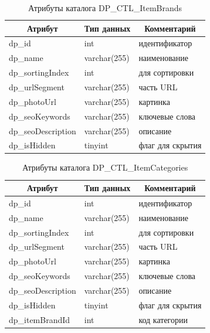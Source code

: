 \begin{table}[p]
    \centering\small

    \caption{Атрибуты каталога DP\_CTL\_ItemBrands}
    \label{tab:DP_CTL_ItemBrands}

    \begin{tabular}{|p{5cm}|p{2.5cm}|p{9cm}|}
        \hline
        \multicolumn{1}{|c|}{Атрибут}
        & \multicolumn{1}{c|}{Тип данных}
        & \multicolumn{1}{c|}{Комментарий}
        \\ \hline

        dp\_id & int & идентификатор \\ \hline
        dp\_name & varchar(255) & наименование \\ \hline
        dp\_sortingIndex & int & для сортировки \\ \hline
        dp\_urlSegment & varchar(255) & часть URL \\ \hline
        dp\_photoUrl & varchar(255) & картинка\\ \hline
        dp\_seoKeywords & varchar(255) & ключевые слова \\ \hline
        dp\_seoDescription & varchar(255) & описание \\ \hline
        dp\_isHidden & tinyint & флаг для скрытия \\ \hline
    \end{tabular}
\end{table}

\begin{table}[p]
    \centering\small

    \caption{Атрибуты каталога DP\_CTL\_ItemCategories}
    \label{tab:DP_CTL_ItemCategories}

    \begin{tabular}{|p{5cm}|p{2.5cm}|p{9cm}|}
        \hline
        \multicolumn{1}{|c|}{Атрибут}
        & \multicolumn{1}{c|}{Тип данных}
        & \multicolumn{1}{c|}{Комментарий}
        \\ \hline

        dp\_id & int & идентификатор \\ \hline
        dp\_name & varchar(255) & наименование \\ \hline
        dp\_sortingIndex & int & для сортировки \\ \hline
        dp\_urlSegment & varchar(255) & часть URL\\ \hline
        dp\_photoUrl & varchar(255) & картинка\\ \hline
        dp\_seoKeywords & varchar(255) & ключевые слова \\ \hline
        dp\_seoDescription & varchar(255) & описание \\ \hline
        dp\_isHidden & tinyint & флаг для скрытия \\ \hline
        dp\_itemBrandId & int & код категории \\ \hline
    \end{tabular}
\end{table}

